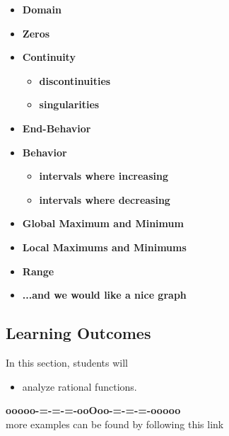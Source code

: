 \documentclass{ximera}
\begin{document}
\begin{itemize}
     \item \textbf{\textcolor{red!80!black}{Domain}} 
     \item \textbf{\textcolor{red!80!black}{Zeros}} 
     \item \textbf{\textcolor{red!80!black}{Continuity}} 
\begin{itemize}
     \item \textbf{\textcolor{purple!85!blue}{discontinuities}} 
     \item \textbf{\textcolor{purple!85!blue}{singularities}} 
\end{itemize}
     \item \textbf{\textcolor{red!80!black}{End-Behavior}} 
     \item \textbf{\textcolor{red!80!black}{Behavior}} 
\begin{itemize}
     \item \textbf{\textcolor{purple!85!blue}{intervals where increasing}} 
     \item \textbf{\textcolor{purple!85!blue}{intervals where decreasing}} 
\end{itemize}
     \item \textbf{\textcolor{red!80!black}{Global Maximum and Minimum}} 
     \item \textbf{\textcolor{red!80!black}{Local Maximums and Minimums}} 
     \item \textbf{\textcolor{red!80!black}{Range}} 
     \item \textbf{\textcolor{blue!55!black}{...and we would like a nice graph}} 
\end{itemize}















\subsection*{Learning Outcomes}


\begin{sectionOutcomes}
In this section, students will 

\begin{itemize}
\item analyze rational functions.
\end{itemize}
\end{sectionOutcomes}











\begin{center}
\textbf{\textcolor{green!50!black}{ooooo-=-=-=-ooOoo-=-=-=-ooooo}} \\

more examples can be found by following this link\\ 

\end{center}
\end{document}
